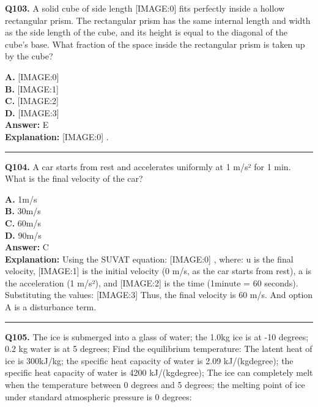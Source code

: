 \documentclass[12pt]{article}
\begin{document}
\noindent
\textbf{Q103.} A solid cube of side length
[IMAGE:0]
fits perfectly inside a hollow rectangular prism. The rectangular prism has the same internal length and width as the side length of the cube, and its height is equal to the diagonal of the cube's base. What fraction of the space inside the rectangular prism is taken up by the cube?



\textbf{A.} [IMAGE:0] \\
\textbf{B.} [IMAGE:1] \\
\textbf{C.} [IMAGE:2] \\
\textbf{D.} [IMAGE:3] \\

\textbf{Answer:} E \\
\textbf{Explanation:} [IMAGE:0]
.

\hrule
\vspace{1em}


\noindent
\textbf{Q104.} A car starts from rest and accelerates uniformly at 1 m/s² for 1 min. What is the final velocity of the car?



\textbf{A.} 1m/s \\
\textbf{B.} 30m/s \\
\textbf{C.} 60m/s \\
\textbf{D.} 90m/s \\

\textbf{Answer:} C \\
\textbf{Explanation:} Using the SUVAT equation:
[IMAGE:0]
, where: u
is the final velocity,
[IMAGE:1]
is the initial velocity (0 m/s, as the car starts from rest), a
is the acceleration (1 m/s²), and
[IMAGE:2]
is the time (1minute = 60 seconds).
Substituting the values:
[IMAGE:3]
Thus, the final velocity is 60 m/s. And option A is a disturbance term.

\hrule
\vspace{1em}


\noindent
\textbf{Q105.} The ice is submerged into a glass of water; the 1.0kg ice is at -10 degrees; 0.2 kg water is at 5 degrees; Find the equilibrium temperature: The latent heat of ice is 300kJ/kg; the specific heat capacity of water is 2.09 kJ/(kg\cdot degree); the specific heat capacity of water is 4200 kJ/(kg\cdot degree); The ice can completely melt when the temperature between 0 degrees and 5 degrees; the melting point of ice under standard atmospheric pressure is 0 degrees:
\end{document}
